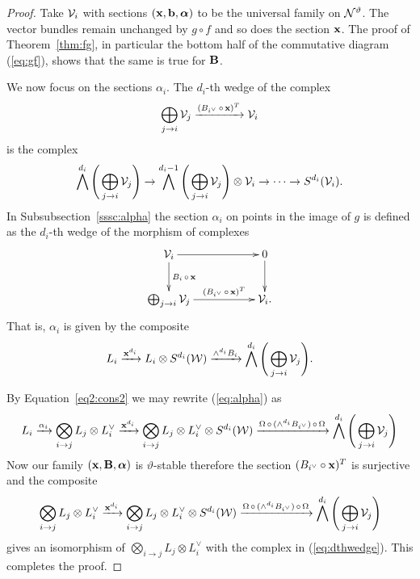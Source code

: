\documentclass{amsart}
\newcommand{\balpha}{\boldsymbol{\alpha}}
\theoremstyle{definition}
\begin{document}
\begin{proof}
Take $\mathcal{V}_i$ with sections $(\bfx, \bfb, \balpha)$ to be the universal family on $\mathcal{N}^\vartheta$.
The vector bundles remain unchanged by $g \circ f$ and so does the section $\mathbf{x}$.
The proof of Theorem~\ref{thm:fg}, in particular the bottom half of the commutative diagram (\ref{eq:gf}), shows that the same is true for $\mathbf{B}$.

We now focus on the sections $\alpha_i$.
The $d_i$-th wedge of the complex
$$\bigoplus_{j \rightarrow i} \mathcal{V}_j \xrightarrow{(B_{i^\vee} \,\circ\, \mathbf{x})^T} \mathcal{V}_i$$
is the complex
\begin{equation}\label{eq:dthwedge}
    \bigwedge^{d_i} \Bigg(\bigoplus_{j \rightarrow i} \mathcal{V}_j \Bigg) \rightarrow \bigwedge^{d_i-1} \Bigg(\bigoplus_{j \rightarrow i} \mathcal{V}_j \Bigg) \otimes \mathcal{V}_i \rightarrow \cdots \rightarrow S^{d_i}(\mathcal{V}_i).
\end{equation}
In Subsubsection~\ref{sssc:alpha} the section $\alpha_i$ on points in the image of $g$ is defined as the $d_i$-th wedge of the morphism of complexes
\begin{equation*}
    \xymatrix{\cV_i \ar[rr] \ar[d]^{B_i \,\circ\, \bfx} && 0 \ar[d] \\
    \bigoplus_{j \rightarrow i} \cV_j \ar[rr]^-{(B_{i^\vee} \,\circ\, \bfx)^T} && \cV_i.}
\end{equation*}
That is, $\alpha_i$ is given by the composite 
\begin{equation}\label{eq:alpha}
    L_i \xrightarrow{\mathbf{x}^{d_i}} L_i \otimes S^{d_i}(\mathcal{W}) \xrightarrow{\wedge^{d_i} B_{i}} 
\bigwedge^{d_i} \Bigg(\bigoplus_{j \rightarrow i} \mathcal{V}_j \Bigg).
\end{equation}

By Equation~\ref{eq2:cons2} we may rewrite (\ref{eq:alpha}) as 
$$L_i \xrightarrow{\alpha_i} \bigotimes_{i \rightarrow j} L_j  \otimes L_i^\vee \xrightarrow{\mathbf{x}^{d_i}} \bigotimes_{i \rightarrow j} L_j \otimes L_i^\vee \otimes S^{d_i}(\mathcal{W}) \xrightarrow{\Omega \,\circ\, (\wedge^{d_i} B_{i^\vee}) \,\circ\, \Omega} 
\bigwedge^{d_i} \Bigg(\bigoplus_{j \rightarrow i} \mathcal{V}_j \Bigg)$$
Now our family $(\bfx, \bfB, \balpha)$ is $\vartheta$-stable therefore the section $(B_{i^\vee} \circ \mathbf{x})^T$ is surjective and the composite $$\bigotimes_{i \rightarrow j} L_j  \otimes L_i^\vee \xrightarrow{\mathbf{x}^{d_i}} \bigotimes_{i \rightarrow j} L_j \otimes L_i^\vee \otimes S^{d_i}(\mathcal{W}) \xrightarrow{\Omega \,\circ\, (\wedge^{d_i} B_{i^\vee}) \,\circ\, \Omega} 
\bigwedge^{d_i} \Bigg(\bigoplus_{j \rightarrow i} \mathcal{V}_j \Bigg)$$
gives an isomorphism of $\bigotimes_{i \rightarrow j} L_j  \otimes L_i^\vee$ with the complex in (\ref{eq:dthwedge}).
This completes the proof.
\end{proof}
\end{document}
